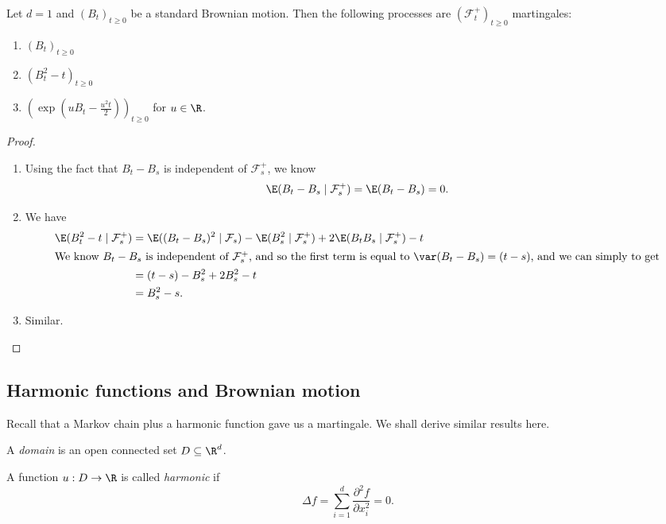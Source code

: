 \documentclass[a4paper]{article}
\begin{document}
\begin{prop}
  Let $d = 1$ and $(B_t)_{t \geq 0}$ be a standard Brownian motion. Then the following processes are $(\mathcal{F}_t^+)_{t \geq 0}$ martingales:
  \begin{enumerate}
    \item $(B_t)_{t \geq 0}$
    \item $(B_t^2 - t)_{t \geq 0}$
    \item $\left(\exp\left(u B_t - \frac{u^2 t}{2}\right)\right)_{t \geq 0}$ for $u \in \R$.
  \end{enumerate}
\end{prop}

\begin{proof}\leavevmode
  \begin{enumerate}
    \item Using the fact that $B_t - B_s$ is independent of $\mathcal{F}_s^+$, we know
      \[
        \E (B_t - B_s \mid \mathcal{F}_s^+) = \E (B_t - B_s) = 0.
      \]
    \item We have
      \begin{align*}
        \E (B_t^2 - t \mid \mathcal{F}_s^+) &= \E ((B_t - B_s)^2 \mid \mathcal{F}_s)- \E(B_s^2 \mid \mathcal{F}_s^+) + 2 \E(B_t B_s \mid \mathcal{F}_s^+) - t\\
        \intertext{We know $B_t - B_s$ is independent of $\mathcal{F}_s^+$, and so the first term is equal to $\var(B_t - B_s) = (t - s)$, and we can simply to get}
        &= (t - s) - B_s^2 + 2 B_s^2 - t\\
        &= B_s^2 - s.
      \end{align*}
    \item Similar.\qedhere
  \end{enumerate}
\end{proof}

\subsection{Harmonic functions and Brownian motion}
Recall that a Markov chain plus a harmonic function gave us a martingale. We shall derive similar results here.

\begin{defi}[Domain]
  A \emph{domain} is an open connected set $D \subseteq \R^d$.
\end{defi}

\begin{defi}
  A function $u: D \to \R$ is called \emph{harmonic} if\index{$\Delta$}
  \[
    \Delta f = \sum_{i = 1}^d \frac{\partial^2 f}{\partial x_i^2} = 0.
  \]
\end{defi}
\end{document}
